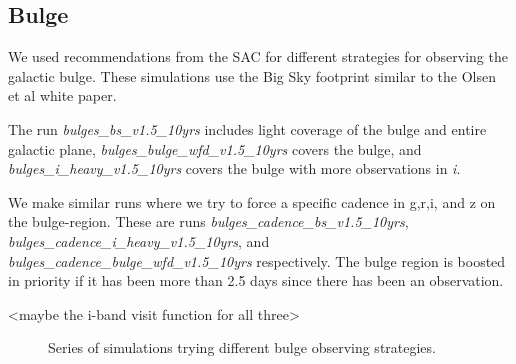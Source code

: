 







\subsection{Bulge}

We used recommendations from the SAC for different strategies for observing the galactic bulge. These simulations use the Big Sky footprint similar to the Olsen et al white paper.  

The run \emph{bulges\_bs\_v1.5\_10yrs} includes light coverage of the bulge and entire galactic plane, \emph{bulges\_bulge\_wfd\_v1.5\_10yrs} covers the bulge, and \emph{bulges\_i\_heavy\_v1.5\_10yrs} covers the bulge with more observations in \emph{i}. 

We make similar runs where we try to force a specific cadence in g,r,i, and z on the bulge-region. These are runs \emph{bulges\_cadence\_bs\_v1.5\_10yrs}, \emph{bulges\_cadence\_i\_heavy\_v1.5\_10yrs}, and \emph{bulges\_cadence\_bulge\_wfd\_v1.5\_10yrs} respectively. The bulge region is boosted in priority if it has been more than 2.5 days since there has been an observation.

<maybe the i-band visit function for all three>
\begin{figure}
\caption{Series of simulations trying different bulge observing strategies.}\label{fig:bulge}
\end{figure}


